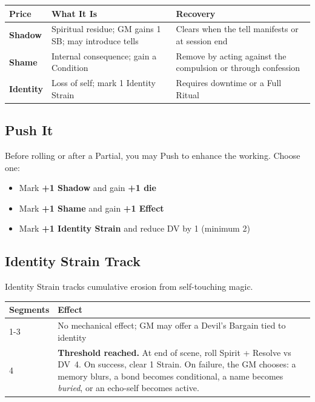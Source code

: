 \documentclass[11pt,letterpaper]{article}
\newcommand{\dv}[1]{\textsc{DV}~#1}
\begin{document}
\begin{table}[H]
\centering
\begin{tabularx}{0.95\linewidth}{@{}lXX@{}}
\toprule
\textbf{Price} & \textbf{What It Is} & \textbf{Recovery} \\
\midrule
\textbf{Shadow} & Spiritual residue; GM gains 1 SB; may introduce tells & Clears when the tell manifests or at session end \\
\textbf{Shame} & Internal consequence; gain a Condition & Remove by acting against the compulsion or through confession \\
\textbf{Identity} & Loss of self; mark 1 Identity Strain & Requires downtime or a Full Ritual \\
\bottomrule
\end{tabularx}
\end{table}

\subsection{Push It}
Before rolling or after a Partial, you may Push to enhance the working. Choose one:
\begin{itemize}
    \item Mark \textbf{+1 Shadow} and gain \textbf{+1 die}
    \item Mark \textbf{+1 Shame} and gain \textbf{+1 Effect}
    \item Mark \textbf{+1 Identity Strain} and reduce DV by 1 (minimum 2)
\end{itemize}

\subsection{Identity Strain Track}
Identity Strain tracks cumulative erosion from self-touching magic.

\begin{table}[H]
\centering
\begin{tabularx}{0.9\linewidth}{@{}lX@{}}
\toprule
\textbf{Segments} & \textbf{Effect} \\
\midrule
1-3 & No mechanical effect; GM may offer a Devil's Bargain tied to identity \\
4 & \textbf{Threshold reached.} At end of scene, roll Spirit + Resolve vs \dv{4}. On success, clear 1 Strain. On failure, the GM chooses: a memory blurs, a bond becomes conditional, a name becomes \textit{buried}, or an echo-self becomes active. \\
\bottomrule
\end{tabularx}
\end{table}
\end{document}
